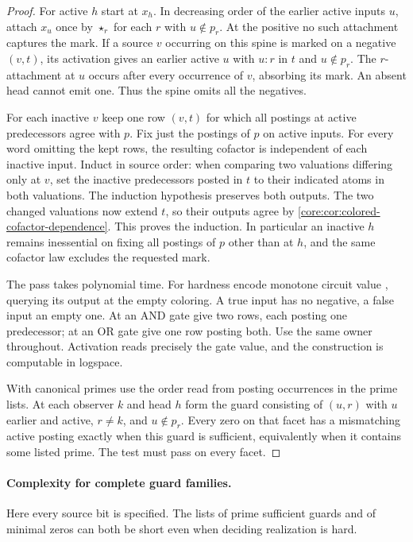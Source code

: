 \begin{proof}
For active $h$ start at $x_h$. In decreasing order of the earlier
active inputs $u$, attach $x_u$ once by $\star_r$ for each $r$ with
$u\notin p_r$. At the positive no such attachment captures the mark.
If a source $v$ occurring on this spine is marked on a negative
$(v,t)$, its activation gives an earlier active $u$ with $u:r$ in
$t$ and $u\notin p_r$. The $r$-attachment at $u$ occurs after
every occurrence of $v$, absorbing its mark. An absent head cannot
emit one. Thus the spine omits all the negatives.

For each inactive $v$ keep one row $(v,t)$ for which all postings
at active predecessors agree with $p$. Fix just the postings of
$p$ on active inputs. For every word omitting the kept rows, the
resulting cofactor is independent of each inactive input. Induct
in source order: when comparing two valuations differing only at
$v$, set the inactive predecessors posted in $t$ to their indicated
atoms in both valuations. The induction hypothesis preserves both
outputs. The two changed valuations now extend $t$, so their outputs
agree by \cref{core:cor:colored-cofactor-dependence}. This proves the
induction. In particular an inactive $h$ remains inessential on
fixing all postings of $p$ other than at $h$, and the same cofactor
law excludes the requested mark.

The pass takes polynomial time. For hardness encode monotone circuit
value \cite{Goldschlager1977}, querying its output at the empty
coloring. A true input has no negative, a false input an empty one.
At an AND gate give two rows, each posting one predecessor; at an
OR gate give one row posting both. Use the same owner throughout.
Activation reads precisely the gate value, and the construction is
computable in logspace.

With canonical primes use the order read from posting occurrences
in the prime lists. At each observer $k$ and head $h$ form the guard
consisting of $(u,r)$ with $u$ earlier and active, $r\ne k$, and
$u\notin p_r$. Every zero on that facet has a mismatching active
posting exactly when this guard is sufficient, equivalently when it
contains some listed prime. The test must pass on every facet.
\end{proof}

\paragraph{Complexity for complete guard families.}
Here every source bit is specified. The lists of prime sufficient guards
and of minimal zeros can both be short even when deciding realization
is hard.

